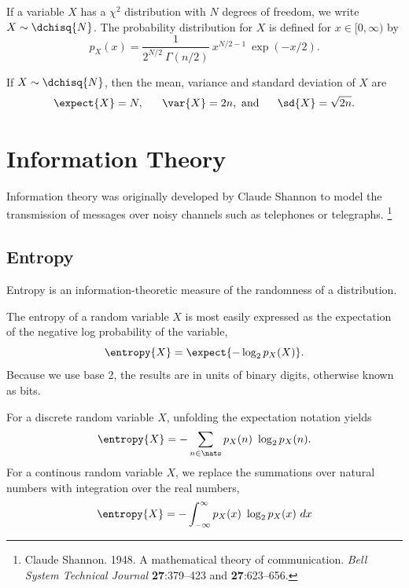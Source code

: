 If a variable $X$ has a $\chi^2$ distribution with $N$ degrees of
freedom, we write $X \sim \dchisq{N}$.  The probability distribution
for $X$ is defined for $x \in [0,\infty)$ by
%
\begin{equation}
p_X(x) = \frac{1}{2^{N/2} \ \Gamma(n/2)} \ x^{N/2-1} \ \exp(-x/2).
\end{equation}
%

If $X \sim \dchisq{N}$, then the mean, variance and standard deviation of $X$ are
%
\begin{equation}
\expect{X} = N,
\ \ \ \ \ 
\var{X} = 2n, \mbox{ and}
\ \ \ \ \  
\sd{X} = \sqrt{2n}.
\end{equation}


\section{Information Theory}\label{section:stats-information-theory}

Information theory was originally developed by Claude Shannon to model
the transmission of messages over noisy channels such as telephones
or telegraphs.%
%
\footnote{Claude Shannon. 1948.  A mathematical theory of
  communication.  {\it Bell System Technical Journal} {\bf
    27}:379--423 and {\bf 27}:623--656.}

\subsection{Entropy}\label{section:stats-entropy}

Entropy is an information-theoretic measure of the randomness of a
distribution.  


The entropy of a random variable $X$ is most easily expressed as the
expectation of the negative log probability of the variable,
%
\begin{equation}
\entropy{X} = \expect{- \log_2 p_X(X)}.
\end{equation}
%
Because we use base 2, the results are in units of binary digits,
otherwise known as bits.

For a discrete random variable $X$, unfolding the expectation notation
yields
%
\begin{equation}
\entropy{X} = - \sum_{n \in \nats} p_X(n) \ \log_2 p_X(n).
\end{equation}
%
For a continous random variable $X$, we replace the summations
over natural numbers with integration over the real numbers,
%
\begin{equation}
\entropy{X} = - \int_{-\infty}^{\infty} p_X(x) \ \log_2 p_X(x) \ dx
\end{equation}

